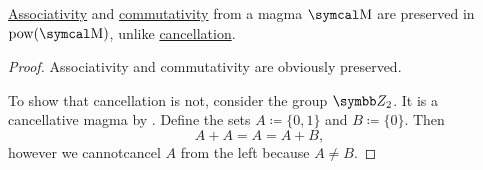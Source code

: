 \begin{proposition}\label{thm:power_set_magma_preservation}
  \hyperref[def:magma/associative]{Associativity} and \hyperref[def:magma/commutative]{commutativity} from a magma \( \CM \) are preserved in \( \Pow(\CM) \), unlike \hyperref[def:magma/cancellative]{cancellation}.
\end{proposition}
\begin{proof}
  Associativity and commutativity are obviously preserved.

  To show that cancellation is not, consider the group \hyperref[def:group_of_integers_modulo]{\( \BZ_2 \)}. It is a cancellative magma by . Define the sets \( A \coloneqq \{ 0, 1 \} \) and \( B \coloneqq \{ 0 \} \). Then
  \begin{equation*}
    A + A = A = A + B,
  \end{equation*}
  however we cannot\LEM cancel \( A \) from the left because \( A \neq B \).
\end{proof}

